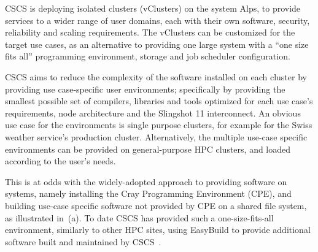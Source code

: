 CSCS is deploying isolated clusters (vClusters) on the \crayex system Alps, to provide services to a wider range of user domains, each with their own software, security, reliability and scaling requirements.
The vClusters can be customized for the target use cases, as an alternative to providing one large system with a ``one size fits all'' programming environment, storage and job scheduler configuration.

CSCS aims to reduce the complexity of the software installed on each cluster by providing use case-specific user environments; specifically by providing the smallest possible set of compilers, libraries and tools optimized for each use case's requirements, node architecture and the Slingshot 11 interconnect.
An obvious use case for the environments is single purpose clusters, for example for the Swiss weather service's production cluster.
Alternatively, the multiple use-case specific environments can be provided on general-purpose HPC clusters, and loaded according to the user's needs.

This is at odds with the widely-adopted approach to providing software on \crayex systems, namely installing the Cray Programming Environment (CPE), and building use-case specific software not provided by CPE on a shared file system, as illustrated in~(a).
To date CSCS has provided such a one-size-fits-all environment, similarly to other HPC sites, using EasyBuild to provide additional software built and maintained by CSCS~\cite{forai:cug16}.


